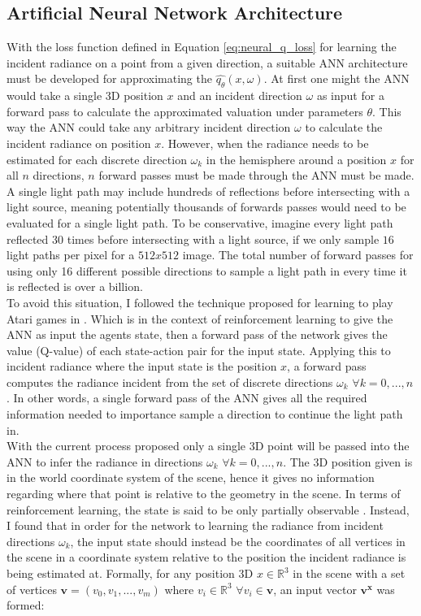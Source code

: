 \documentclass[../dissertation.tex]{subfiles}
\begin{document}
\subsection{Artificial Neural Network Architecture}

With the loss function defined in Equation \ref{eq:neural_q_loss} for learning the incident radiance on a point from a given direction, a suitable ANN architecture must be developed for approximating the $\hat{q_\theta}(x,\omega)$. At first one might the ANN would take a single 3D position $x$ and an incident direction $\omega$ as input for a forward pass to calculate the approximated valuation under parameters $\theta$. This way the ANN could take any arbitrary incident direction $\omega$ to calculate the incident radiance on position $x$. However, when the radiance needs to be estimated for each discrete direction $\omega_k$ in the hemisphere around a position $x$ for all $n$ directions, $n$ forward passes must be made through the ANN must be made. A single light path may include hundreds of reflections before intersecting with a light source, meaning potentially thousands of forwards passes would need to be evaluated for a single light path. To be conservative, imagine every light path reflected 30 times before intersecting with a light source, if we only sample $16$ light paths per pixel for a $512x512$ image. The total number of forward passes for using only 16 different possible directions to sample a light path in every time it is reflected is over a billion.\\

To avoid this situation, I followed the technique proposed for learning to play Atari games in \cite{mnih2013playing}. Which is in the context of reinforcement learning to give the ANN as input the agents state, then a forward pass of the network gives the value (Q-value) of each state-action pair for the input state. Applying this to incident radiance where the input state is the position $x$, a forward pass computes the radiance incident from the set of discrete directions $\omega_k$ $\forall k = 0, ..., n$.  In other words, a single forward pass of the ANN gives all the required information needed to importance sample a direction to continue the light path in.\\

With the current process proposed only a single 3D point will be passed into the ANN to infer the radiance in directions $\omega_k$ $\forall k = 0, ..., n$. The 3D position given is in the world coordinate system of the scene, hence it gives no information regarding where that point is relative to the geometry in the scene. In terms of reinforcement learning, the state is said to be only partially observable \cite{sutton2011reinforcement}. Instead, I found that in order for the network to learning the  radiance from incident directions $\omega_k$, the input state should instead be the coordinates of all vertices in the scene in a coordinate system relative to the position the incident radiance is being estimated at. Formally, for any position 3D $x \in \mathbb{R}^3$ in the scene with a set of vertices $\mathbf{v} = (v_0, v_1, ..., v_m)$ where $v_i \in \mathbb{R}^3$ $\forall v_i \in \mathbf{v}$, an input vector $\mathbf{v^x}$ was formed:
\end{document}
